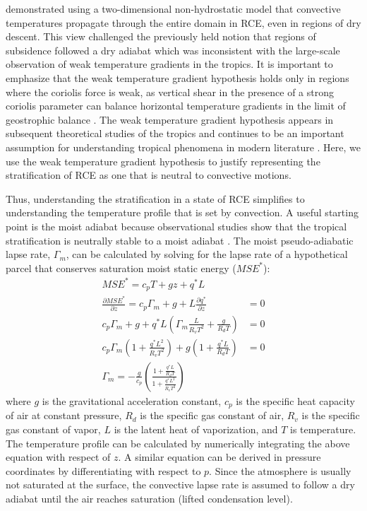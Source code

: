 \documentclass{article}
\begin{document}
\citet{bretherton-smolarkiewicz-1989} demonstrated using a two-dimensional non-hydrostatic model that convective temperatures propagate through the entire domain in RCE, even in regions of dry descent. This view challenged the previously held notion that regions of subsidence followed a dry adiabat \citep{bjerknes-1938} which was inconsistent with the large-scale observation of weak temperature gradients in the tropics. It is important to emphasize that the weak temperature gradient hypothesis holds only in regions where the coriolis force is weak, as vertical shear in the presence of a strong coriolis parameter can balance horizontal temperature gradients in the limit of geostrophic balance \citep{vallis-2017}. The weak temperature gradient hypothesis appears in subsequent theoretical studies of the tropics \citep{pierrehumbert-1995, nilsson-emanuel-1999, sobel-et-al-2001} and continues to be an important assumption for understanding tropical phenomena in modern literature \citep{vallis-et-al-2015}. Here, we use the weak temperature gradient hypothesis to justify representing the stratification of RCE as one that is neutral to convective motions.

Thus, understanding the stratification in a state of RCE simplifies to understanding the temperature profile that is set by convection. A useful starting point is the moist adiabat because observational studies show that the tropical stratification is neutrally stable to a moist adiabat \citep{betts-1982, xu-emanuel-1989}. The moist pseudo-adiabatic lapse rate, $\Gamma_m$, can be calculated by solving for the lapse rate of a hypothetical parcel that conserves saturation moist static energy ($MSE^*$):
\begin{align}
MSE^* = c_pT+gz+q^*L & \\
\frac{\partial MSE^*}{\partial z} = c_p\Gamma_m+g+L\frac{\partial q^*}{\partial z} &=0 \\
c_p\Gamma_m+g+ q^* L\left( \Gamma_m \frac{L}{R_vT^2} + \frac{g}{R_dT}\right ) &=0 \\
c_p\Gamma_m \left( 1 + \frac{q^* L^2}{R_vT^2} \right ) + g \left( 1 + \frac{q^* L}{R_dT} \right ) &= 0 \\
\Gamma_m = - \frac{g}{c_p}\left(\frac{1 + \frac{q^* L}{R_dT}}{1 + \frac{q^* L^2}{R_vT^2}} \right)
\end{align}
where $g$ is the gravitational acceleration constant, $c_p$ is the specific heat capacity of air at constant pressure, $R_d$ is the specific gas constant of air, $R_v$ is the specific gas constant of vapor, $L$ is the latent heat of vaporization, and $T$ is temperature. The temperature profile can be calculated by numerically integrating the above equation with respect of $z$. A similar equation can be derived in pressure coordinates by differentiating with respect to $p$. Since the atmosphere is usually not saturated at the surface, the convective lapse rate is assumed to follow a dry adiabat until the air reaches saturation (lifted condensation level).
\end{document}
